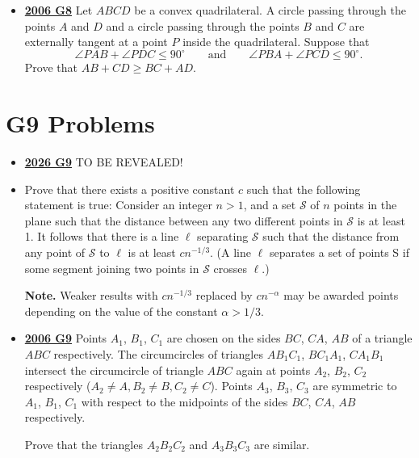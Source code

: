 \documentclass[11pt]{scrartcl}
\begin{document}
\begin{itemize}[leftmargin=*]
Prove that points $ E$, $ I$, and $ F$ are collinear.


\item \href{https://artofproblemsolving.com/community/c6h155712p875030}{\textbf{2006 G8}} Let $ABCD$ be a convex quadrilateral. A circle passing through the points $A$ and $D$ and a circle passing through the points $B$ and $C$ are externally tangent at a point $P$ inside the quadrilateral. Suppose that\[\angle{PAB}+\angle{PDC}\leqslant  90^\circ\qquad\text{and}\qquad\angle{PBA}+\angle{PCD}\leqslant  90^\circ.\]Prove that $AB+CD \geqslant BC+AD$.
\end{itemize}
\newpage
\section*{G9 Problems}  \label{G9}
\begin{itemize}[leftmargin=*]


\item \href{https://www.imo-official.org/assets/documents/problems/2026/IMO2026SL.pdf}{\textbf{2026 G9}} TO BE REVEALED!

 
    \item {}  Prove that there exists a positive constant $c$ such that the following statement is true:
Consider an integer $n > 1$, and a set $\mathcal S$ of $n$ points in the plane such that the distance between any two different points in $\mathcal S$ is at least 1. It follows that there is a line $\ell$ separating $\mathcal S$ such that the distance from any point of $\mathcal S$ to $\ell$ is at least $cn^{-1/3}$. (A line $\ell$ separates a set of points S if some segment joining two points in $\mathcal S$ crosses $\ell$.)

\textbf{Note.} Weaker results with $cn^{-1/3}$ replaced by $cn^{-\alpha}$ may be awarded points depending on the value of the constant $\alpha > 1/3$.
\item \href{https://artofproblemsolving.com/community/c6h155713p875036}{\textbf{2006 G9}} Points $ A_{1}$, $ B_{1}$, $ C_{1}$ are chosen on the sides $ BC$, $ CA$, $ AB$ of a triangle $ ABC$ respectively. The circumcircles of triangles $ AB_{1}C_{1}$, $ BC_{1}A_{1}$, $ CA_{1}B_{1}$ intersect the circumcircle of triangle $ ABC$ again at points $ A_{2}$, $ B_{2}$, $ C_{2}$ respectively ($ A_{2}\neq A, B_{2}\neq B, C_{2}\neq C$). Points $ A_{3}$, $ B_{3}$, $ C_{3}$ are symmetric to $ A_{1}$, $ B_{1}$, $ C_{1}$ with respect to the midpoints of the sides $ BC$, $ CA$, $ AB$ respectively. 

Prove that the triangles $ A_{2}B_{2}C_{2}$ and $ A_{3}B_{3}C_{3}$ are similar.
\end{itemize}
\end{document}

